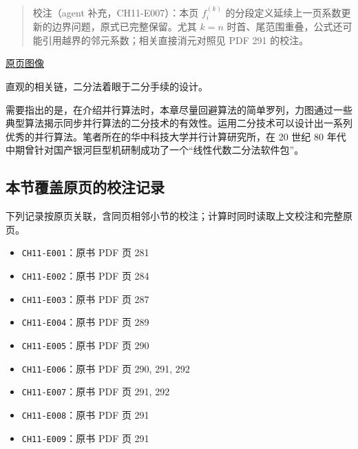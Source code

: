 \documentclass[
  10pt,
  fontset=fandol]{ctexart}
\providecommand{\tightlist}{%
  \setlength{\itemsep}{0pt}\setlength{\parskip}{0pt}}
\begin{document}
\begin{quote}
校注（agent 补充，CH11-E007）：本页 \(f_i^{(k)}\) 的分段定义延续上一页系数更新的边界问题，原式已完整保留。尤其 \(k=n\) 时首、尾范围重叠，公式还可能引用越界的邻元系数；相关直接消元对照见 PDF 291 的校注。
\end{quote}

\href{../../source-images/pdf-293.jpeg}{原页图像}

直观的相关链，二分法着眼于二分手续的设计。

需要指出的是，在介绍并行算法时，本章尽量回避算法的简单罗列，力图通过一些典型算法揭示同步并行算法的二分技术的有效性。运用二分技术可以设计出一系列优秀的并行算法。笔者所在的华中科技大学并行计算研究所，在 20 世纪 80 年代中期曾针对国产银河巨型机研制成功了一个``线性代数二分法软件包''。

\subsection{本节覆盖原页的校注记录}\label{ux672cux8282ux8986ux76d6ux539fux9875ux7684ux6821ux6ce8ux8bb0ux5f55}

下列记录按原页关联，含同页相邻小节的校注；计算时同时读取上文校注和完整原页。

\begin{itemize}
\tightlist
\item
  \texttt{CH11-E001}：原书 PDF 页 281
\item
  \texttt{CH11-E002}：原书 PDF 页 284
\item
  \texttt{CH11-E003}：原书 PDF 页 287
\item
  \texttt{CH11-E004}：原书 PDF 页 289
\item
  \texttt{CH11-E005}：原书 PDF 页 290
\item
  \texttt{CH11-E006}：原书 PDF 页 290, 291, 292
\item
  \texttt{CH11-E007}：原书 PDF 页 291, 292
\item
  \texttt{CH11-E008}：原书 PDF 页 291
\item
  \texttt{CH11-E009}：原书 PDF 页 291
\end{itemize}
\end{document}

